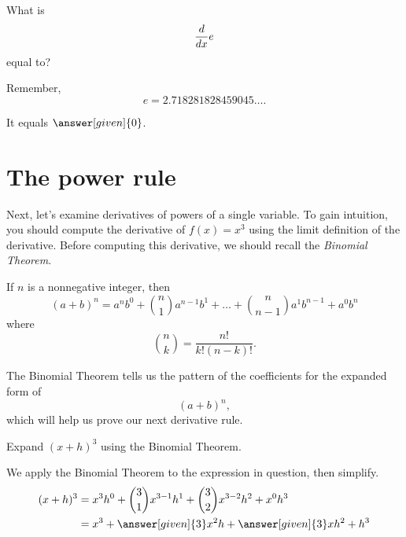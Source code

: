 \documentclass{ximera}
\begin{document}
\begin{question}
  What is
  \[
  \frac{d}{\mathop{}\!d x} e
  \]
  equal to?
  \begin{hint}
    Remember,
    \[
    e = 2.718281828459045\dots.
    \]
  \end{hint}
  \begin{prompt}
    It equals $\answer[given]{0}$.
  \end{prompt}
\end{question}


\section{The power rule}

Next, let's examine derivatives of powers of a single variable. 
To gain intuition, you should compute the
derivative of $f(x) = x^3$ using the limit definition of the
derivative. Before computing this derivative, we should recall 
the \textit{Binomial Theorem}.

\begin{theorem}
If $n$ is a nonnegative integer, then
\[
(a+b)^n = a^nb^0 + \binom{n}{1} a^{n-1}b^1 + \dots + \binom{n}{n-1} a^{1}b^{n-1} +  a^{0}b^n   
\]
where
\[
\binom{n}{k} = \frac{n!}{k!(n-k)!}.
\]
\end{theorem}
The Binomial Theorem tells us the pattern of the coefficients for the
expanded form of
\[
(a+b)^n,
\]
which will help us prove our next derivative rule.

\begin{example}
Expand $(x+h)^3$ using the Binomial Theorem.
\begin{explanation}
We apply the Binomial Theorem to the expression in question, then simplify.
\begin{align*}
(x+h)^3 &= x^3h^0 + \binom{3}{1} x^{3-1}h^1 + \binom{3}{2} x^{3-2}h^2 + x^{0}h^3\\
	& = x^3 + \answer[given]{3} x^2 h + \answer[given]{3} xh^2 + h^3
\end{align*}
\end{explanation}
\end{example}
\end{document}
